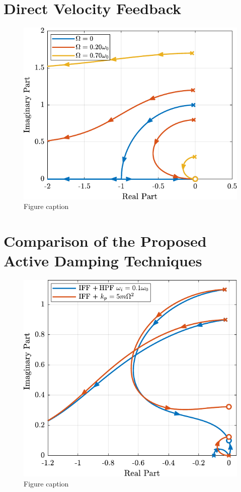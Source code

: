 \documentclass{ISMA_USD2020}
\begin{document}
\section{Direct Velocity Feedback}
\label{sec:orgb0a5870}

\begin{figure}[htbp]
\centering
\includegraphics[scale=1]{figs/root_locus_dvf.pdf}
\caption{\label{fig:root_locus_dvf}Figure caption}
\end{figure}

\section{Comparison of the Proposed Active Damping Techniques}
\label{sec:org6097c1d}

\begin{figure}[htbp]
\centering
\includegraphics[scale=1]{figs/comp_root_locus.pdf}
\caption{\label{fig:comp_root_locus}Figure caption}
\end{figure}
\end{document}
